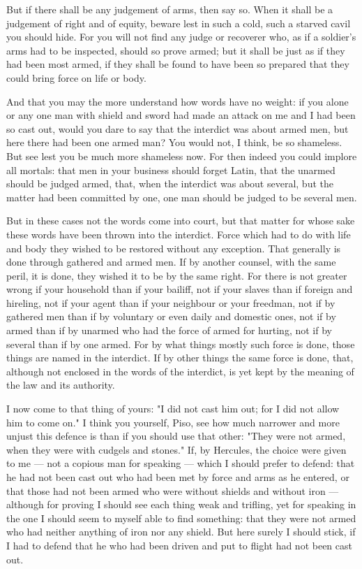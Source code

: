  But if there shall be any judgement of arms, then say so. When it shall be a judgement of right and of equity, beware lest in such a cold, such a starved cavil you should hide. For you will not find any judge or recoverer who, as if a soldier's arms had to be inspected, should so prove armed; but it shall be just as if they had been most armed, if they shall be found to have been so prepared that they could bring force on life or body.

 And that you may the more understand how words have no weight: if you alone or any one man with shield and sword had made an attack on me and I had been so cast out, would you dare to say that the interdict was about armed men, but here there had been one armed man? You would not, I think, be so shameless. But see lest you be much more shameless now. For then indeed you could implore all mortals: that men in your business should forget Latin, that the unarmed should be judged armed, that, when the interdict was about several, but the matter had been committed by one, one man should be judged to be several men.

 But in these cases not the words come into court, but that matter for whose sake these words have been thrown into the interdict. Force which had to do with life and body they wished to be restored without any exception. That generally is done through gathered and armed men. If by another counsel, with the same peril, it is done, they wished it to be by the same right. For there is not greater wrong if your household than if your bailiff, not if your slaves than if foreign and hireling, not if your agent than if your neighbour or your freedman, not if by gathered men than if by voluntary or even daily and domestic ones, not if by armed than if by unarmed who had the force of armed for hurting, not if by several than if by one armed. For by what things mostly such force is done, those things are named in the interdict. If by other things the same force is done, that, although not enclosed in the words of the interdict, is yet kept by the meaning of the law and its authority.

 I now come to that thing of yours: "I did not cast him out; for I did not allow him to come on." I think you yourself, Piso, see how much narrower and more unjust this defence is than if you should use that other: "They were not armed, when they were with cudgels and stones." If, by Hercules, the choice were given to me --- not a copious man for speaking --- which I should prefer to defend: that he had not been cast out who had been met by force and arms as he entered, or that those had not been armed who were without shields and without iron --- although for proving I should see each thing weak and trifling, yet for speaking in the one I should seem to myself able to find something: that they were not armed who had neither anything of iron nor any shield. But here surely I should stick, if I had to defend that he who had been driven and put to flight had not been cast out.

